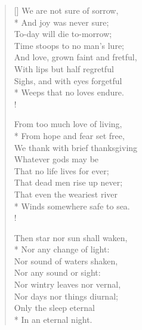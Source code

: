 \documentclass[MAIN]{subfiles}
\begin{document}
\begin{verse}[\versewidth]
We are not sure of sorrow,\\*
\vin And joy was never sure;\\
To-day will die to-morrow;\\ 
\vin Time stoops to no man's lure;\\ 
And love, grown faint and fretful,\\ 
With lips but half regretful\\
Sighs, and with eyes forgetful\\*
\vin Weeps that no loves endure.\\!

From too much love of living,\\*
\vin From hope and fear set free,\\
We thank with brief thanksgiving\\
\vin Whatever gods may be\\
That no life lives for ever;\\
That dead men rise up never;\\
That even the weariest river\\*
\vin Winds somewhere safe to sea.\\!

Then star nor sun shall waken,\\*
\vin Nor any change of light:\\
Nor sound of waters shaken,\\
\vin Nor any sound or sight:\\
Nor wintry leaves nor vernal,\\
Nor days nor things diurnal;\\
Only the sleep eternal\\*
\vin In an eternal night.
\end{verse}
\end{document}

